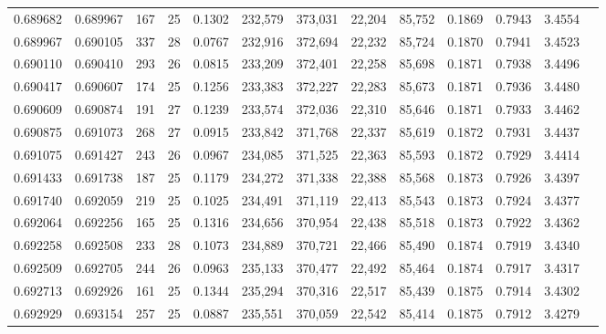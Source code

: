 \begin{tabular}{rrrrrrrrrrrrr}
0.689682 & 0.689967 &   167 &  25 &                                     0.1302 & 232,579 & 373,031 &  22,204 &  85,752 & 0.1869 & 0.7943 & 3.4554 \\
0.689967 & 0.690105 &   337 &  28 &                                     0.0767 & 232,916 & 372,694 &  22,232 &  85,724 & 0.1870 & 0.7941 & 3.4523 \\
0.690110 & 0.690410 &   293 &  26 &                                     0.0815 & 233,209 & 372,401 &  22,258 &  85,698 & 0.1871 & 0.7938 & 3.4496 \\
0.690417 & 0.690607 &   174 &  25 &                                     0.1256 & 233,383 & 372,227 &  22,283 &  85,673 & 0.1871 & 0.7936 & 3.4480 \\
0.690609 & 0.690874 &   191 &  27 &                                     0.1239 & 233,574 & 372,036 &  22,310 &  85,646 & 0.1871 & 0.7933 & 3.4462 \\
0.690875 & 0.691073 &   268 &  27 &                                     0.0915 & 233,842 & 371,768 &  22,337 &  85,619 & 0.1872 & 0.7931 & 3.4437 \\
0.691075 & 0.691427 &   243 &  26 &                                     0.0967 & 234,085 & 371,525 &  22,363 &  85,593 & 0.1872 & 0.7929 & 3.4414 \\
0.691433 & 0.691738 &   187 &  25 &                                     0.1179 & 234,272 & 371,338 &  22,388 &  85,568 & 0.1873 & 0.7926 & 3.4397 \\
0.691740 & 0.692059 &   219 &  25 &                                     0.1025 & 234,491 & 371,119 &  22,413 &  85,543 & 0.1873 & 0.7924 & 3.4377 \\
0.692064 & 0.692256 &   165 &  25 &                                     0.1316 & 234,656 & 370,954 &  22,438 &  85,518 & 0.1873 & 0.7922 & 3.4362 \\
0.692258 & 0.692508 &   233 &  28 &                                     0.1073 & 234,889 & 370,721 &  22,466 &  85,490 & 0.1874 & 0.7919 & 3.4340 \\
0.692509 & 0.692705 &   244 &  26 &                                     0.0963 & 235,133 & 370,477 &  22,492 &  85,464 & 0.1874 & 0.7917 & 3.4317 \\
0.692713 & 0.692926 &   161 &  25 &                                     0.1344 & 235,294 & 370,316 &  22,517 &  85,439 & 0.1875 & 0.7914 & 3.4302 \\
0.692929 & 0.693154 &   257 &  25 &                                     0.0887 & 235,551 & 370,059 &  22,542 &  85,414 & 0.1875 & 0.7912 & 3.4279 \\

\end{tabular}

